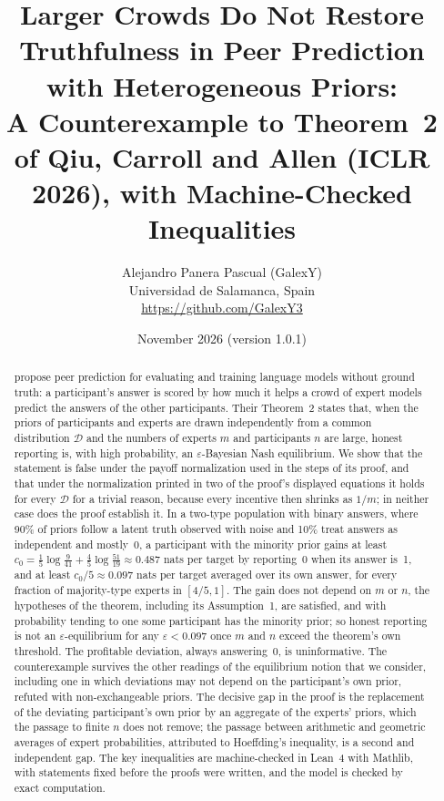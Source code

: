 \documentclass[11pt]{article}
\title{Larger Crowds Do Not Restore Truthfulness in Peer Prediction with Heterogeneous Priors:\\
A Counterexample to Theorem~2 of Qiu, Carroll and Allen (ICLR 2026), with Machine-Checked Inequalities}
\author{Alejandro Panera Pascual (GalexY)\\ \small Universidad de Salamanca, Spain\\ \small \url{https://github.com/GalexY3}}
\date{November 2026 (version 1.0.1)}
\theoremstyle{remark}
\newcommand{\cD}{\mathcal{D}}
\begin{document}
\maketitle

\begin{abstract}
\citet{qiu2026truthfulness} propose peer prediction for evaluating and training language models without ground truth: a participant's answer is scored by how much it helps a crowd of expert models predict the answers of the other participants. Their Theorem~2 states that, when the priors of participants and experts are drawn independently from a common distribution $\cD$ and the numbers of experts $m$ and participants $n$ are large, honest reporting is, with high probability, an $\varepsilon$-Bayesian Nash equilibrium. We show that the statement is false under the payoff normalization used in the steps of its proof, and that under the normalization printed in two of the proof's displayed equations it holds for every $\cD$ for a trivial reason, because every incentive then shrinks as $1/m$; in neither case does the proof establish it. In a two-type population with binary answers, where 90\% of priors follow a latent truth observed with noise and 10\% treat answers as independent and mostly~0, a participant with the minority prior gains at least $c_0=\tfrac15\log\tfrac{9}{41}+\tfrac45\log\tfrac{51}{19}\approx0.487$ nats per target by reporting~0 when its answer is~1, and at least $c_0/5\approx0.097$ nats per target averaged over its own answer, for every fraction of majority-type experts in $[4/5,1]$. The gain does not depend on $m$ or $n$, the hypotheses of the theorem, including its Assumption~1, are satisfied, and with probability tending to one some participant has the minority prior; so honest reporting is not an $\varepsilon$-equilibrium for any $\varepsilon<0.097$ once $m$ and $n$ exceed the theorem's own threshold. The profitable deviation, always answering~0, is uninformative. The counterexample survives the other readings of the equilibrium notion that we consider, including one in which deviations may not depend on the participant's own prior, refuted with non-exchangeable priors. The decisive gap in the proof is the replacement of the deviating participant's own prior by an aggregate of the experts' priors, which the passage to finite $n$ does not remove; the passage between arithmetic and geometric averages of expert probabilities, attributed to Hoeffding's inequality, is a second and independent gap. The key inequalities are machine-checked in Lean~4 with Mathlib, with statements fixed before the proofs were written, and the model is checked by exact computation.
\end{abstract}
\end{document}
